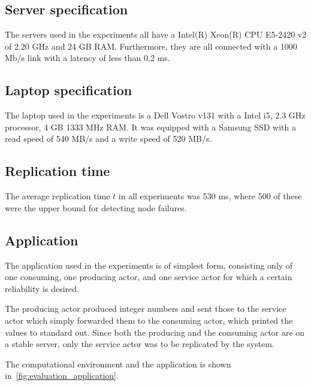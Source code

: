 \documentclass{cslthse-msc}
\begin{document}
\subsection{Server specification} \label{sec:server_spec}
The servers used in the experiments all have a Intel(R) Xeon(R) CPU E5-2420 v2 of 2.20 GHz and 24 GB RAM. Furthermore, they are all connected with a 1000 Mb/s link with a latency of less than 0.2 ms. 

\subsection{Laptop specification} \label{sec:laptop_spec}
The laptop used in the experiments is a Dell Vostro v131 with a Intel i5, 2.3 GHz processor, 4 GB 1333 MHz RAM. It was equipped with a Samsung SSD with a read speed of 540 MB/s and a write speed of 520 MB/s. 

\subsection{Replication time}
The average replication time $t$ in all experiments was 530 ms, where 500 of these were the upper bound for detecting node failures.

\subsection{Application} \label{sec:eval_application}
The application used in the experiments is of simplest form, consisting only of one consuming, one producing actor, and one service actor for which a certain reliability is desired. 

The producing actor produced integer numbers and sent those to the service actor which simply forwarded them to the consuming actor, which printed the values to standard out. Since both the producing and the consuming actor are on a stable server, only the service actor was to be replicated by the system.

The computational environment and the application is shown in~\cref{fig:evaluation_application}.
\end{document}
